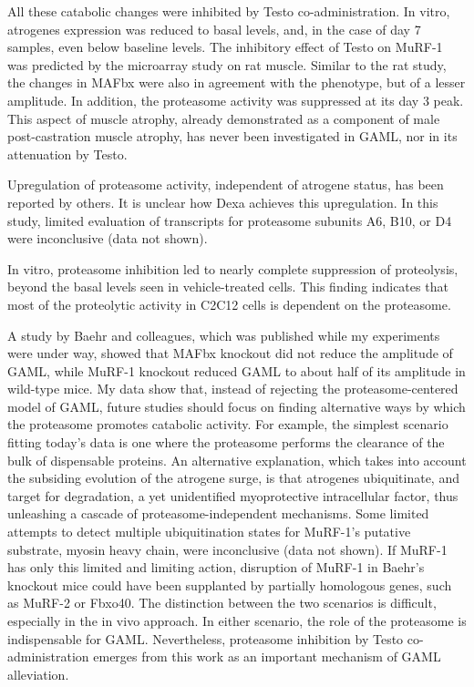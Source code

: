 \documentclass[12pt,english]{report}\usepackage[]{graphicx}\usepackage[]{color}
\begin{document}
All these catabolic changes were inhibited by Testo co-administration.
In vitro, atrogenes expression was reduced to basal levels, and, in
the case of day 7 samples, even below baseline levels. The inhibitory
effect of Testo on MuRF-1 was predicted by the microarray study on
rat muscle. Similar to the rat study, the changes in MAFbx were also
in agreement with the phenotype, but of a lesser amplitude. In addition,
the proteasome activity was suppressed at its day 3 peak. This aspect
of muscle atrophy, already demonstrated as a component of male post-castration
muscle atrophy\citep{serra2013effects}, has never been investigated
in GAML, nor in its attenuation by Testo.

Upregulation of proteasome activity, independent of atrogene status,
has been reported by others\citep{baehr2014muscle}. It is unclear
how Dexa achieves this upregulation. In this study, limited evaluation
of transcripts for proteasome subunits A6, B10, or D4 were inconclusive
(data not shown).

In vitro, proteasome inhibition led to nearly complete suppression
of proteolysis, beyond the basal levels seen in vehicle-treated cells.
This finding indicates that most of the proteolytic activity in C2C12
cells is dependent on the proteasome.

A study by Baehr and colleagues\citep{baehr2011muscle}, which was
published while my experiments were under way, showed that MAFbx knockout
did not reduce the amplitude of GAML, while MuRF-1 knockout reduced
GAML to about half of its amplitude in wild-type mice. My data show
that, instead of rejecting the proteasome-centered model of GAML,
future studies should focus on finding alternative ways by which the
proteasome promotes catabolic activity. For example, the simplest
scenario fitting today's data is one where the proteasome performs
the clearance of the bulk of dispensable proteins. An alternative
explanation, which takes into account the subsiding evolution of the
atrogene surge, is that atrogenes ubiquitinate, and target for degradation,
a yet unidentified myoprotective intracellular factor, thus unleashing
a cascade of proteasome-independent mechanisms. Some limited attempts
to detect multiple ubiquitination states for MuRF-1's putative substrate,
myosin heavy chain, were inconclusive (data not shown). If MuRF-1
has only this limited and limiting action, disruption of MuRF-1 in
Baehr's knockout mice could have been supplanted by partially homologous
genes, such as MuRF-2 or Fbxo40\citep{shi2011scf-fbxo40,witt2005murf-1}.
The distinction between the two scenarios is difficult, especially
in the in vivo approach. In either scenario, the role of the proteasome
is indispensable for GAML. Nevertheless, proteasome inhibition by
Testo co-administration emerges from this work as an important mechanism
of GAML alleviation.
\end{document}
